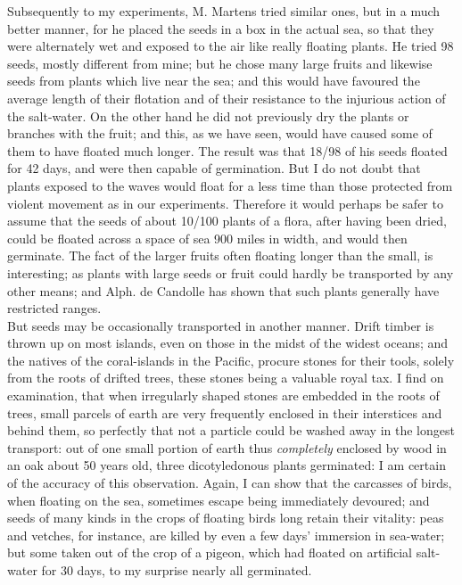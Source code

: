 \indent Subsequently to my experiments, M. Martens tried similar ones, but in a much better manner, for he placed the seeds in a box in the actual sea, so that they were alternately wet and exposed to the air like really floating plants. He tried 98 seeds, mostly different from mine; but he chose many large fruits and likewise seeds from plants which live near the sea; and this would have favoured the average length of their flotation and of their resistance to the injurious action of the salt-water. On the other hand he did not previously dry the plants or branches with the fruit; and this, as we have seen, would have caused some of them to have floated much longer. The result was that 18/98 of his seeds floated for 42 days, and were then capable of germination. But I do not doubt that plants exposed to the waves would float for a less time than those protected from violent movement as in our experiments. Therefore it would perhaps be safer to assume that the seeds of about 10/100 plants of a flora, after having been dried, could be floated across a space of sea 900 miles in width, and would then germinate. The fact of the larger fruits often floating longer than the small, is interesting; as plants with large seeds or fruit could hardly be transported by any other means; and Alph. de Candolle has shown that such plants generally have restricted ranges.~\\
\indent But seeds may be occasionally transported in another manner. Drift timber is thrown up on most islands, even on those in the midst of the widest oceans; and the natives of the coral-islands in the Pacific, procure stones for their tools, solely from the roots of drifted trees, these stones being a valuable royal tax. I find on examination, that when irregularly shaped stones are embedded in the roots of trees, small parcels of earth are very frequently enclosed in their interstices and behind them, so perfectly that not a particle could be washed away in the longest transport: out of one small portion of earth thus \emph{completely} enclosed by wood in an oak about 50 years old, three dicotyledonous plants germinated: I am certain of the accuracy of this observation.  Again, I can show that the carcasses of birds, when floating on the sea, sometimes escape being immediately devoured; and seeds of many kinds in the crops of floating birds long retain their vitality: peas and vetches, for instance, are killed by even a few days' immersion in sea-water; but some taken out of the crop of a pigeon, which had floated on artificial salt-water for 30 days, to my surprise nearly all germinated.~\\
